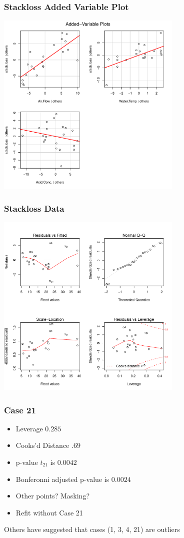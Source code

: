 \documentclass[]{beamer}
\begin{document}
  \begin{frame}
    \frametitle{Stackloss Added Variable Plot}
    \centerline{\includegraphics[height=3.5in]{stackloss-avp}}
  \end{frame}
  \begin{frame}
    \frametitle{Stackloss Data}
    \centerline{\includegraphics[height=3.5in]{stackloss-resid}}
  \end{frame}
  \begin{frame}
    \frametitle{Case 21}
    \begin{itemize}
    \item Leverage $0.285$
\item Cooks'd Distance $.69$
\item p-value $t_{21}$ is $0.0042$
\item Bonferonni adjusted p-value is $0.0024$
\item Other points?  Masking?  
\item Refit without Case 21
    \end{itemize}
Others have suggested that cases (1, 3, 4, 21) are outliers
  \end{frame}
\end{document}
